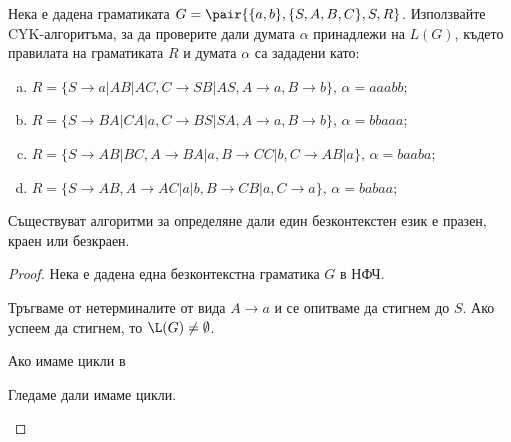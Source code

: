 
\begin{problem}
  Нека е дадена граматиката $G = \pair{\{a,b\}, \{S,A,B,C\},S,R}$.
  Използвайте CYK-алгоритъма, за да проверите дали
  думата $\alpha$ принадлежи на $L(G)$, където правилата на граматиката $R$ и думата $\alpha$
  са зададени като:
  \begin{enumerate}[a)]
  \item
    $R =\{S\rightarrow a| AB|AC, C\rightarrow SB|AS,A\rightarrow a, B\rightarrow b\}$, $\alpha=aaabb$;
  \item
    $R = \{S\rightarrow BA| CA|a, C\rightarrow BS|SA,A\rightarrow a, B\rightarrow b\}$, $\alpha=bbaaa$;
  \item
    $R =\{S\rightarrow AB|BC, A\rightarrow BA|a,B\rightarrow CC|b, C\rightarrow AB|a\}$, $\alpha=baaba$;
  \item
    $R = \{S\rightarrow AB, A\rightarrow AC|a|b,B\rightarrow CB|a, C\rightarrow a\}$, $\alpha=babaa$;
  \end{enumerate}
\end{problem}

\begin{thm}
  Съществуват алгоритми за определяне дали един безконтекстен език е 
  празен, краен или безкраен.
\end{thm}
\begin{proof}
  Нека е дадена една безконтекстна граматика $G$ в НФЧ.
  \begin{description}
  \item[($\L(G) = \emptyset?$)]
    Тръгваме от нетерминалите от вида $A\to a$ и се опитваме да стигнем до $S$.
    Ако успеем да стигнем, то $\L(G) \neq \emptyset$.
  \item
    Ако имаме цикли в 
  \item[($\abs{\L(G)} < \infty?$ или $\abs{\L(G)} = \infty?$)]
    Гледаме дали имаме цикли.
  \end{description}
\end{proof}

